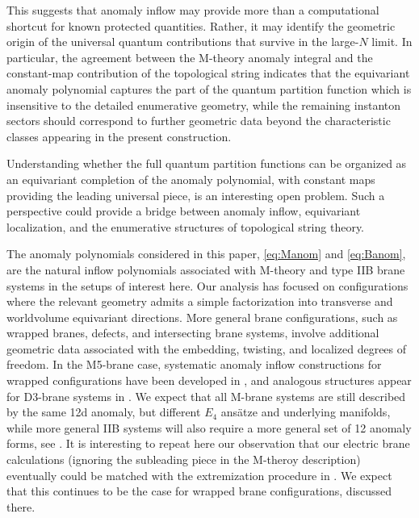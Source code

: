 \documentclass[11pt,a4paper]{article}
\theoremstyle{definition}
\theoremstyle{identity}
\theoremstyle{remark}
\begin{document}
This suggests that anomaly inflow may provide more than a computational shortcut for known
protected quantities. Rather, it may identify the geometric origin of the universal quantum
contributions that survive in the large-$N$ limit. In particular, the agreement between the
M-theory anomaly integral and the constant-map contribution of the topological string indicates
that the equivariant anomaly polynomial captures the part of the quantum partition function
which is insensitive to the detailed enumerative geometry, while the remaining instanton
sectors should correspond to further geometric data beyond the characteristic classes appearing
in the present construction.

Understanding whether the full quantum partition functions can be organized as an equivariant
completion of the anomaly polynomial, with constant maps providing the leading universal piece,
is an interesting open problem. Such a perspective could provide a bridge between anomaly
inflow, equivariant localization, and the enumerative structures of topological string theory.

\medskip

The anomaly polynomials considered in this paper,
\eqref{eq:Manom} and \eqref{eq:Banom},
are the natural inflow polynomials associated with M-theory and type IIB brane systems in the
setups of interest here. Our analysis has focused on configurations where the relevant geometry
admits a simple factorization into transverse and worldvolume equivariant directions. More
general brane configurations, such as wrapped branes, defects, and intersecting brane systems,
involve additional geometric data associated with the embedding, twisting, and localized degrees
of freedom. In the M5-brane case, systematic anomaly inflow constructions for wrapped
configurations have been developed in
\cite{Bah:2018jrv,Bah:2019jts,Bah:2019rgq},
and analogous structures appear for D3-brane systems in
\cite{Bah:2020jas}.
We expect that all M-brane systems are still described by the same 12d anomaly, but different $E_4$ ans\"atze and underlying manifolds, while more general IIB systems will also require a more general set of 12 anomaly forms, see \cite{Couzens:2026xmi}. It is interesting to repeat here our observation that our electric brane calculations (ignoring the subleading piece in the M-theroy description) eventually could be matched with the extremization procedure in \cite{Martelli:2023oqk,Colombo:2023fhu}. We expect that this continues to be the case for wrapped brane configurations, discussed there.
\end{document}

